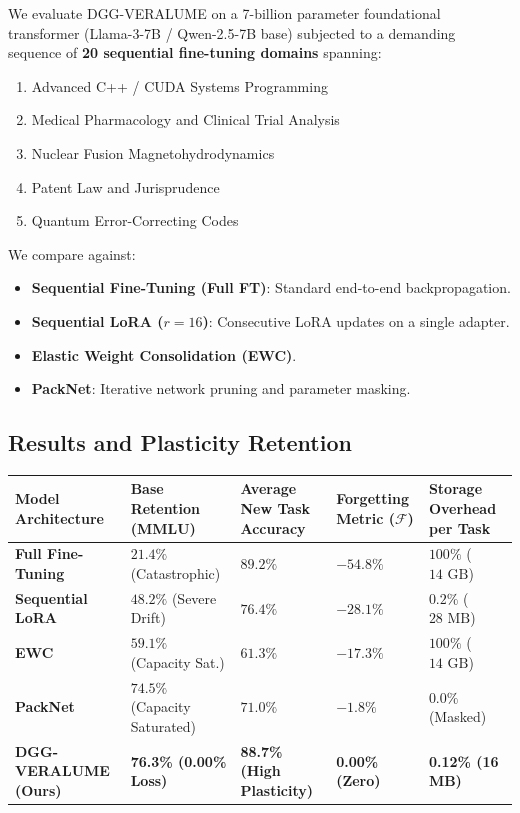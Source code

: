 \documentclass[10pt,twocolumn]{article}
\begin{document}
We evaluate DGG-VERALUME on a 7-billion parameter foundational transformer (Llama-3-7B / Qwen-2.5-7B base) subjected to a demanding sequence of \textbf{20 sequential fine-tuning domains} spanning:
\begin{enumerate}
  \item Advanced C++ / CUDA Systems Programming
  \item Medical Pharmacology and Clinical Trial Analysis
  \item Nuclear Fusion Magnetohydrodynamics
  \item Patent Law and Jurisprudence
  \item Quantum Error-Correcting Codes
\end{enumerate}

We compare against:
\begin{itemize}
  \item \textbf{Sequential Fine-Tuning (Full FT)}: Standard end-to-end backpropagation.
  \item \textbf{Sequential LoRA ($r=16$)}: Consecutive LoRA updates on a single adapter.
  \item \textbf{Elastic Weight Consolidation (EWC)}.
  \item \textbf{PackNet}: Iterative network pruning and parameter masking.
\end{itemize}


\subsection{Results and Plasticity Retention}

\begin{table}[htbp]
\centering
\small
\begin{tabular}{lllll}
\toprule
Model Architecture & Base Retention (MMLU) & Average New Task Accuracy & Forgetting Metric ($\mathcal{F}$) & Storage Overhead per Task \\
\midrule
\textbf{Full Fine-Tuning} & $21.4\%$ (Catastrophic) & $89.2\%$ & $-54.8\%$ & $100\%$ ($14\text{ GB}$) \\
\textbf{Sequential LoRA} & $48.2\%$ (Severe Drift) & $76.4\%$ & $-28.1\%$ & $0.2\%$ ($28\text{ MB}$) \\
\textbf{EWC} & $59.1\%$ (Capacity Sat.) & $61.3\%$ & $-17.3\%$ & $100\%$ ($14\text{ GB}$) \\
\textbf{PackNet} & $74.5\%$ (Capacity Saturated) & $71.0\%$ & $-1.8\%$ & $0.0\%$ (Masked) \\
\textbf{DGG-VERALUME (Ours)} & \textbf{76.3\% (0.00\% Loss)} & \textbf{88.7\% (High Plasticity)} & \textbf{0.00\% (Zero)} & \textbf{0.12\% (16 MB)} \\
\bottomrule
\end{tabular}
\end{table}
\end{document}
